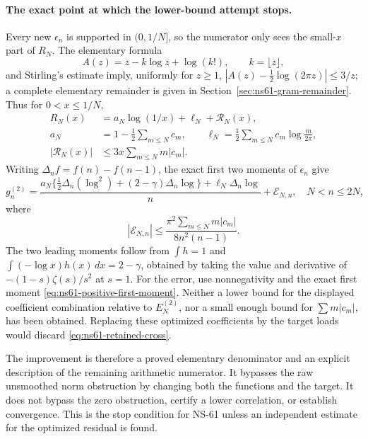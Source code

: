 \paragraph{The exact point at which the lower-bound attempt stops.}
Every new $\epsilon_n$ is supported in $(0,1/N]$, so the numerator
only sees the small-$x$ part of $R_N$. The elementary formula
\[
 A(z)=z-k\log z+\log(k!),\qquad k=\lfloor z\rfloor,
\]
and Stirling's estimate imply, uniformly for $z\geq1$,
$|A(z)-\tfrac12\log(2\pi z)|\leq3/z$; a complete elementary
remainder is given in Section~\ref{sec:ns61-gram-remainder}.
Thus for $0<x\leq1/N$,
\begin{equation}
 \begin{aligned}
 R_N(x)&=a_N\log(1/x)+\ell_N+\mathcal R_N(x),\\
 a_N&=1-\tfrac12\sum_{m\leq N}c_m,\qquad
 \ell_N=\tfrac12\sum_{m\leq N}c_m\log\frac m{2\pi},\\
 |\mathcal R_N(x)|&\leq3x\sum_{m\leq N}m|c_m|.
 \end{aligned}
 \label{eq:ns61-residual-endpoint}
\end{equation}
Writing $\Delta_n f=f(n)-f(n-1)$, the exact first two moments of
$\epsilon_n$ give
\begin{equation}
 g_n^{(2)}=
 \frac{a_N\{\tfrac12\Delta_n(\log^2)+(2-\gamma)\Delta_n\log\}
              +\ell_N\Delta_n\log}{n}
 +\mathcal E_{N,n},
 \quad N<n\leq2N,
 \label{eq:ns61-endpoint-correlation}
\end{equation}
where
\[
 |\mathcal E_{N,n}|\leq
       \frac{\pi^2\sum_{m\leq N}m|c_m|}{8n^2(n-1)}.
\]
The two leading moments follow from $\int h=1$ and
$\int(-\log x)h(x)\,dx=2-\gamma$, obtained by taking the value
and derivative of $-(1-s)\zeta(s)/s^2$ at $s=1$.
For the error, use nonnegativity and the exact first moment
\eqref{eq:ns61-positive-first-moment}. Neither a lower bound for the displayed
coefficient combination relative to $E_N^{(2)}$, nor a small enough
bound for $\sum m|c_m|$, has been obtained. Replacing these optimized
coefficients by the target loads would discard
\eqref{eq:ns61-retained-cross}.

The improvement is therefore a proved elementary denominator and an
explicit description of the remaining arithmetic numerator. It bypasses
the raw unsmoothed norm obstruction by changing both the functions and
the target. It does not bypass the zero obstruction, certify a lower
correlation, or establish convergence. This is the stop condition for
NS-61 unless an independent estimate for the optimized residual is found.

